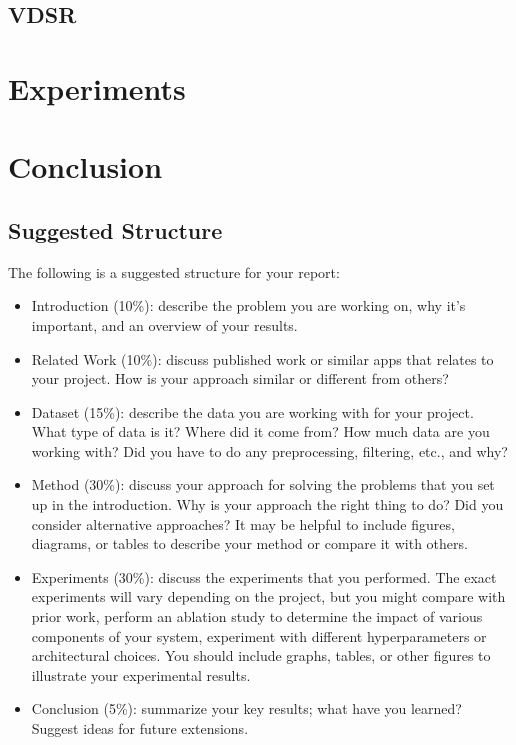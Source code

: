 \documentclass[10pt,twocolumn,letterpaper]{article}
\begin{document}
\subsection{VDSR}



\section{Experiments}

\section{Conclusion}


\subsection{Suggested Structure}

The following is a suggested structure for your report:

\begin{itemize}
	\item Introduction (10\%): describe the problem you are working on, why it's important, and an overview of your results.
	\item Related Work (10\%): discuss published work or similar apps that relates to your project. How is your approach similar or different from others?
	\item Dataset (15\%): describe the data you are working with for your project. What type of data is it? Where did it come from? How much data are you working with? Did you have to do any preprocessing, filtering, etc., and why?
	\item Method (30\%): discuss your approach for solving the problems that you set up in the introduction. Why is your approach the right thing to do? Did you consider alternative approaches? It may be helpful to include figures, diagrams, or tables to describe your method or compare it with others.
	\item Experiments (30\%): discuss the experiments that you performed. The exact experiments will vary depending on the project, but you might compare with prior work, perform an ablation study to determine the impact of various components of your system, experiment with different hyperparameters or architectural choices. You should include graphs, tables, or other figures to illustrate your experimental results.
	\item Conclusion (5\%): summarize your key results; what have you learned? Suggest ideas for future extensions.
\end{itemize}	
\end{document}
